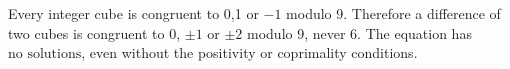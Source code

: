 Every integer cube is congruent to 0,1 or $-1$ modulo 9. Therefore a difference of two cubes is congruent to 0, $\pm1$ or $\pm2$ modulo 9, never 6. The equation has $\boxed{\text{no solutions}}$, even without the positivity or coprimality conditions.
